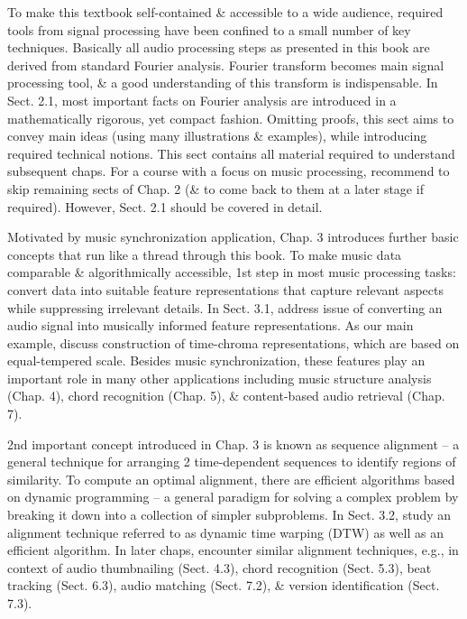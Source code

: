 \documentclass{article}
\begin{document}
\begin{itemize}
\begin{itemize}
		To make this textbook self-contained \& accessible to a wide audience, required tools from signal processing have been confined to a small number of key techniques. Basically all audio processing steps as presented in this book are derived from standard Fourier analysis. Fourier transform becomes main signal processing tool, \& a good understanding of this transform is indispensable. In Sect. 2.1, most important facts on Fourier analysis are introduced in a mathematically rigorous, yet compact fashion. Omitting proofs, this sect aims to convey main ideas (using many illustrations \& examples), while introducing required technical notions. This sect contains all material required to understand subsequent chaps. For a course with a focus on music processing, recommend to skip remaining sects of Chap. 2 (\& to come back to them at a later stage if required). However, Sect. 2.1 should be covered in detail.
		
		Motivated by music synchronization application, Chap. 3 introduces further basic concepts that run like a thread through this book. To make music data comparable \& algorithmically accessible, 1st step in most music processing tasks: convert data into suitable feature representations that capture relevant aspects while suppressing irrelevant details. In Sect. 3.1, address issue of converting an audio signal into musically informed feature representations. As our main example, discuss construction of time-chroma representations, which are based on equal-tempered scale. Besides music synchronization, these features play an important role in many other applications including music structure analysis (Chap. 4), chord recognition (Chap. 5), \& content-based audio retrieval (Chap. 7).
		
		2nd important concept introduced in Chap. 3 is known as sequence alignment -- a general technique for arranging 2 time-dependent sequences to identify regions of similarity. To compute an optimal alignment, there are efficient algorithms based on dynamic programming -- a general paradigm for solving a complex problem by breaking it down into a collection of simpler subproblems. In Sect. 3.2, study an alignment technique referred to as dynamic time warping (DTW) as well as an efficient algorithm. In later chaps, encounter similar alignment techniques, e.g., in context of audio thumbnailing (Sect. 4.3), chord recognition (Sect. 5.3), beat tracking (Sect. 6.3), audio matching (Sect. 7.2), \& version identification (Sect. 7.3).
		

\end{itemize}
\end{itemize}
\end{document}
